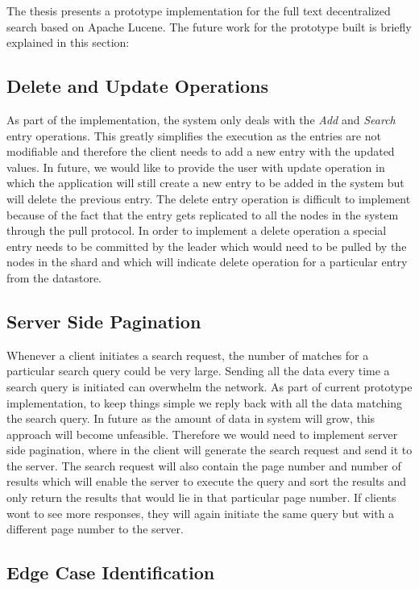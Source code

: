 \documentclass[a4paper,11pt]{kth-mag}
\begin{document}
The thesis presents a prototype implementation for the full text decentralized search based on Apache Lucene. The future work for the prototype built is briefly explained in this section:


\subsection{Delete and Update Operations}

As part of the implementation, the system only deals with the \textit{Add} and \textit{Search} entry operations. This greatly simplifies the execution as the entries are not modifiable and therefore the client needs to add a new entry with the updated values. In future, we would like to provide the user with update operation in which the application will still create a new entry to be added in the system but will delete the previous entry. The delete entry operation is difficult to implement because of the fact that the entry gets replicated to all the nodes in the system through the pull protocol. In order to implement a delete operation a special entry needs to be committed by the leader which would need to be pulled by the nodes in the shard and which will indicate delete operation for a particular entry from the datastore.

\subsection{Server Side Pagination}

Whenever a client initiates a search request, the number of matches for a particular search query could be very large. Sending all the data every time a search query is initiated can overwhelm the network. As part of current prototype implementation, to keep things simple we reply back with all the data matching the search query. In future as the amount of data in system will grow, this approach will become unfeasible. Therefore we would need to implement server side pagination, where in the client will generate the search request and send it to the server. The search request will also contain the page number and number of results which will enable the server to execute the query and sort the results and only return the results that would lie in that particular page number. If clients wont to see more responses, they will again initiate the same query but with a different page number to the server.


\subsection{Edge Case Identification}
\end{document}
